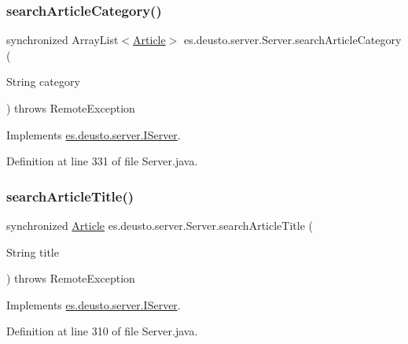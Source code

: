 \subsubsection{\texorpdfstring{search\+Article\+Category()}{searchArticleCategory()}}
{\footnotesize\ttfamily synchronized Array\+List$<$\hyperlink{classes_1_1deusto_1_1server_1_1jdo_1_1_article}{Article}$>$ es.\+deusto.\+server.\+Server.\+search\+Article\+Category (\begin{DoxyParamCaption}\item[{String}]{category }\end{DoxyParamCaption}) throws Remote\+Exception}



Implements \hyperlink{interfacees_1_1deusto_1_1server_1_1_i_server_ab08ccd2295e983571cf50431d273393a}{es.\+deusto.\+server.\+I\+Server}.



Definition at line 331 of file Server.\+java.

\mbox{\label{classes_1_1deusto_1_1server_1_1_server_a56ae654d89e8113c79615077ed4a6e24}} 
\subsubsection{\texorpdfstring{search\+Article\+Title()}{searchArticleTitle()}}
{\footnotesize\ttfamily synchronized \hyperlink{classes_1_1deusto_1_1server_1_1jdo_1_1_article}{Article} es.\+deusto.\+server.\+Server.\+search\+Article\+Title (\begin{DoxyParamCaption}\item[{String}]{title }\end{DoxyParamCaption}) throws Remote\+Exception}



Implements \hyperlink{interfacees_1_1deusto_1_1server_1_1_i_server_ab2c4bd97c628b735feedcf16e6aeb6b8}{es.\+deusto.\+server.\+I\+Server}.



Definition at line 310 of file Server.\+java.

\mbox{\label{classes_1_1deusto_1_1server_1_1_server_ada6d55bcd79444de821eaeb6b21c44b8}} 

